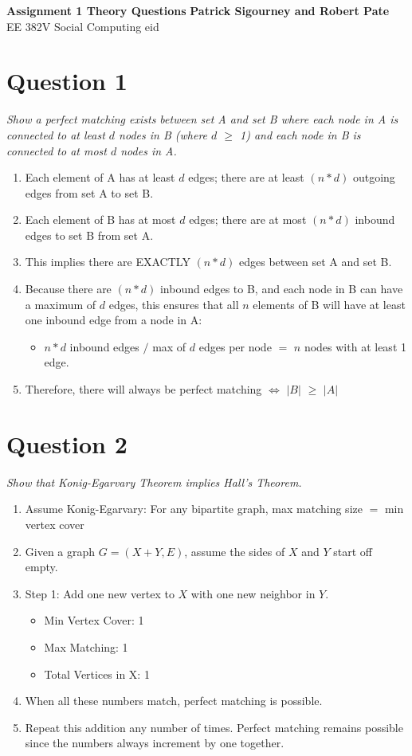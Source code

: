 \documentclass[a4paper, 11pt]{article}
\begin{document}
\noindent
\large\textbf{Assignment 1 Theory Questions} \hfill \textbf{Patrick Sigourney and Robert Pate} \\
\normalsize EE 382V Social Computing \hfill eid

\section*{Question 1}

\textit{Show a perfect matching exists between set A and set B where each node in A is connected to at least \(d\) nodes in B (where \(d\) $\geq$ 1) and each node in B is connected to at most \(d\) nodes in A.}

\begin{enumerate}
\item Each element of A has at least \(d\) edges; there are at least \((n*d)\) outgoing edges from set A to set B.
\item Each element of B has at most \(d\) edges; there are at most \((n*d)\) inbound edges to set B from set A.
\item This implies there are EXACTLY \((n*d)\) edges between set A and set B.
\item Because there are \((n*d)\) inbound edges to B, and each node in B can have a maximum of \(d\) edges, this ensures that all \(n\) elements of B will have at least one inbound edge from a node in A:
\begin{itemize}
\item   \(n * d\) inbound edges \(/\) max of \(d\) edges per node \(=\) \(n\) nodes with at least 1 edge.
\end{itemize}
\item Therefore, there will always be perfect matching \(\iff\) \(|B|\) $\geq$ \(|A|\)
\end{enumerate}

\section*{Question 2}
\textit{Show that Konig-Egarvary Theorem implies Hall's Theorem.}

\begin{enumerate}
\item Assume Konig-Egarvary: For any bipartite graph, max matching size \(=\) min vertex cover
\item Given a graph \(G = (X + Y, E)\), assume the sides of \(X\) and \(Y\) start off empty. 
\item Step 1: Add one new vertex to \(X\) with one new neighbor in \(Y\).
\begin{itemize}
    \item Min Vertex Cover: 1
    \item Max Matching: 1
    \item Total Vertices in X: 1
\end{itemize}
\item When all these numbers match, perfect matching is possible.
\item Repeat this addition any number of times. Perfect matching remains possible since the numbers always increment by one together.
\end{enumerate}
\end{document}

